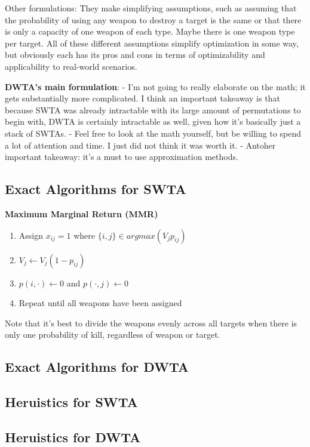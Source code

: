 \documentclass[12pt]{article} %
\begin{document}
Other formulations:
They make simplifying assumptions, such as assuming that the probability of using any weapon
to destroy a target is the same or that there is only a capacity of one weapon of each type. Maybe there is 
one weapon type per target. All of these different assumptions simplify optimization in some way, but obviously
each has its pros and cons in terms of optimizability and applicability to real-world scenarios.  

{\bf DWTA's main formulation}:
- I'm not going to really elaborate on the math; it gets substantially more complicated. I think an important 
takeaway is that because SWTA was already intractable with its large amount of permutations to begin with, 
DWTA is certainly intractable as well, given how it's basically just a stack of SWTAs. 
- Feel free to look at the math yourself, but be willing to spend a lot of attention and time. I just did not think it was worth it.
- Antoher important takeaway: it's a must to use approximation methods. 


\subsection*{Exact Algorithms for SWTA}

{\bf Maximum Marginal Return (MMR)}

\begin{enumerate}
\item Assign $x_{ij} = 1$ where $\{i, j\} \in argmax(V_j p_{ij})$
\item $V_j \leftarrow V_j(1-p_{ij})$
\item $p(i, \cdot) \leftarrow 0$ and $p(\cdot, j) \leftarrow 0$
\item Repeat until all weapons have been assigned
\end{enumerate}

Note that it's best to divide the weapons evenly across all targets when there is only one 
probability of kill, regardless of weapon or target.

\subsection*{Exact Algorithms for DWTA}

\subsection*{Heruistics for SWTA}

\subsection*{Heruistics for DWTA}
\end{document}
